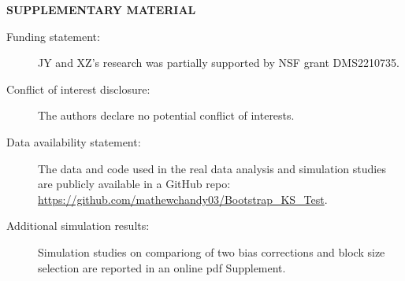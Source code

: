 \documentclass[12pt]{article}
\begin{document}
\bigskip
\begin{center}
{\large\bf SUPPLEMENTARY MATERIAL}
\end{center}

\begin{description}

\item[Funding statement:]JY and XZ's research was partially supported by NSF grant
DMS2210735.

\item[Conflict of interest disclosure:]The authors declare no potential conflict
of interests.

\item[Data availability statement:] The data and code used in the real data analysis and simulation
studies are publicly available in a GitHub repo:\\
\url{https://github.com/mathewchandy03/Bootstrap_KS_Test}.

\item[Additional simulation results:] Simulation studies on compariong
of two bias corrections and block size selection are reported in an
online pdf Supplement.

\end{description}



\end{document}
